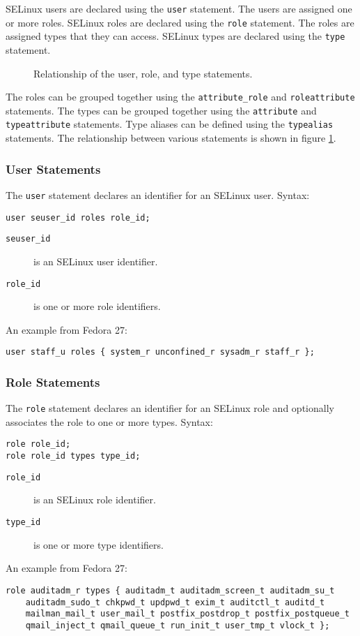 SELinux users are declared using the \texttt{user} statement. The users are
assigned one or more roles. SELinux roles are declared using the \texttt{role}
statement. The roles are assigned types that they can access. SELinux types are
declared using the \texttt{type} statement.

\begin{figure}
    \centering
    \label{fig:userroletype}
    
    \caption{Relationship of the user, role, and type statements.}
\end{figure}

The roles can be grouped together using the \texttt{attribute\_role} and
\texttt{roleattribute} statements. The types can be grouped together using the
\texttt{attribute} and \texttt{typeattribute} statements. Type aliases can be
defined using the \texttt{typealias} statements. The relationship between
various statements is shown in figure \ref{fig:userroletype}.

\subsubsection{User Statements}
The \texttt{user} statement declares an identifier for an SELinux user. Syntax:
\begin{lstlisting}[language=te]
user seuser_id roles role_id;
\end{lstlisting}
\begin{description}
    \item [\texttt{seuser\_id}] is an SELinux user identifier.
    \item [\texttt{role\_id}] is one or more role identifiers.
\end{description}
An example from Fedora 27:
\begin{lstlisting}[language=te]
user staff_u roles { system_r unconfined_r sysadm_r staff_r };
\end{lstlisting}

\subsubsection{Role Statements}
The \texttt{role} statement declares an identifier for an SELinux role and
optionally associates the role to one or more types. Syntax:
\begin{lstlisting}[language=te]
role role_id;
role role_id types type_id;
\end{lstlisting}
\begin{description}
    \item [\texttt{role\_id}] is an SELinux role identifier.
    \item [\texttt{type\_id}] is one or more type identifiers.
\end{description}
An example from Fedora 27:
\begin{lstlisting}[language=te]
role auditadm_r types { auditadm_t auditadm_screen_t auditadm_su_t
    auditadm_sudo_t chkpwd_t updpwd_t exim_t auditctl_t auditd_t
    mailman_mail_t user_mail_t postfix_postdrop_t postfix_postqueue_t
    qmail_inject_t qmail_queue_t run_init_t user_tmp_t vlock_t };
\end{lstlisting}

